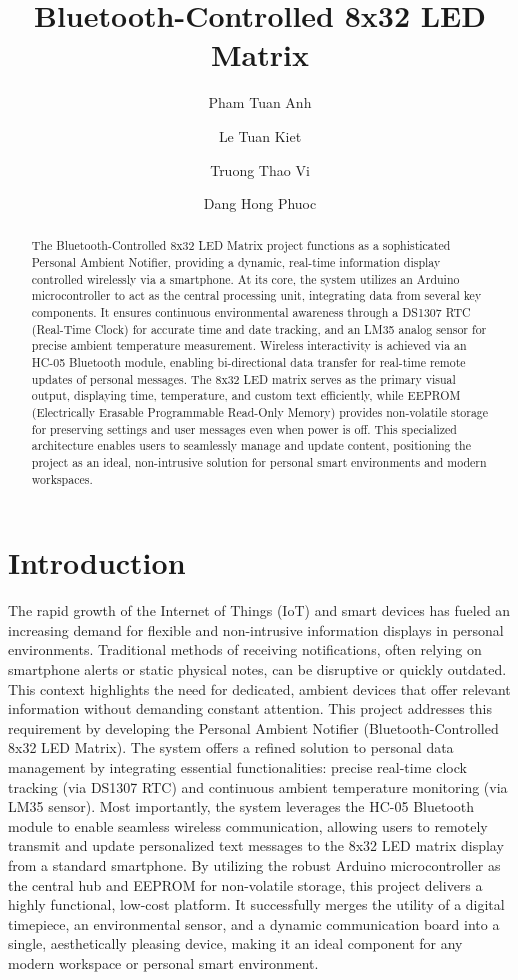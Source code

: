 \documentclass[a4paper, 10pt]{article}
\title{\textbf{Bluetooth-Controlled 8x32 LED Matrix}}
\author[1]{Pham Tuan Anh}
\author[1]{Le Tuan Kiet}
\author[1]{Truong Thao Vi}
\author[1]{Dang Hong Phuoc}
\affil[1]{\small FPT University Ho Chi Minh Campus, Vietnam, Lot E2a-7, D1 Street, Saigon Hi-Tech Park, Tang Nhon Phu Ward, HCMC}
\affil{
	\vspace{0.3cm}
	\texttt{\small anhtph911@gmail.com, lekiet2442005@gmail.com} \\
	\texttt{\small thaovicotntctv@gmail.com, dangp2660@gmail.com}
}
\date{} %
\begin{document}
	
	\maketitle %
	
	\begin{abstract}
		The Bluetooth-Controlled 8x32 LED Matrix project functions as a sophisticated Personal Ambient Notifier, providing a dynamic, real-time information display controlled wirelessly via a smartphone. At its core, the system utilizes an Arduino microcontroller to act as the central processing unit, integrating data from several key components. It ensures continuous environmental awareness through a DS1307 RTC (Real-Time Clock) for accurate time and date tracking, and an LM35 analog sensor for precise ambient temperature measurement. Wireless interactivity is achieved via an HC-05 Bluetooth module, enabling bi-directional data transfer for real-time remote updates of personal messages. The 8x32 LED matrix serves as the primary visual output, displaying time, temperature, and custom text efficiently, while EEPROM (Electrically Erasable Programmable Read-Only Memory) provides non-volatile storage for preserving settings and user messages even when power is off. This specialized architecture enables users to seamlessly manage and update content, positioning the project as an ideal, non-intrusive solution for personal smart environments and modern workspaces.
	\end{abstract}
	\newpage
	\tableofcontents
	\newpage
	\section{Introduction}
	The rapid growth of the Internet of Things (IoT) and smart devices has fueled an increasing demand for flexible and non-intrusive information displays in personal environments. Traditional methods of receiving notifications, often relying on smartphone alerts or static physical notes, can be disruptive or quickly outdated. This context highlights the need for dedicated, ambient devices that offer relevant information without demanding constant attention.
	This project addresses this requirement by developing the Personal Ambient Notifier (Bluetooth-Controlled 8x32 LED Matrix). The system offers a refined solution to personal data management by integrating essential functionalities: precise real-time clock tracking (via DS1307 RTC) and continuous ambient temperature monitoring (via LM35 sensor). Most importantly, the system leverages the HC-05 Bluetooth module to enable seamless wireless communication, allowing users to remotely transmit and update personalized text messages to the 8x32 LED matrix display from a standard smartphone.
	By utilizing the robust Arduino microcontroller as the central hub and EEPROM for non-volatile storage, this project delivers a highly functional, low-cost platform. It successfully merges the utility of a digital timepiece, an environmental sensor, and a dynamic communication board into a single, aesthetically pleasing device, making it an ideal component for any modern workspace or personal smart environment.
	
\end{document}
